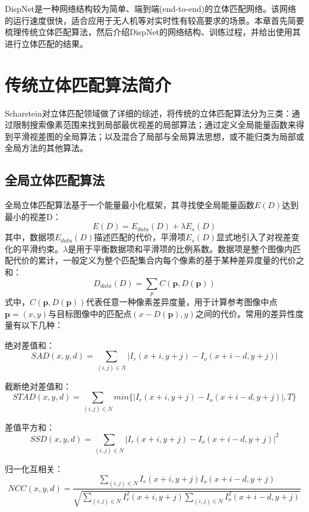 DispNet\cite{mayer2016large}是一种网络结构较为简单、端到端(end-to-end)的立体匹配网络。该网络的运行速度很快，适合应用于无人机等对实时性有较高要求的场景。本章首先简要梳理传统立体匹配算法，然后介绍DispNet的网络结构、训练过程，并给出使用其进行立体匹配的结果。


\section{传统立体匹配算法简介}
Scharstein\cite{Scharstein2002}对立体匹配领域做了详细的综述，将传统的立体匹配算法分为三类：通过限制搜索像素范围来找到局部最优视差的局部算法；通过定义全局能量函数来得到平滑视差图的全局算法；以及混合了局部与全局算法思想，或不能归类为局部或全局方法的其他算法。

\subsection{全局立体匹配算法}
全局立体匹配算法基于一个能量最小化框架，其寻找使全局能量函数$E(D)$达到最小的视差D：
%
\begin{equation}\label{eq:4_0_energy_function}
E(D) = E_{data}(D) + \lambda E_s(D)
\end{equation}
其中，数据项$E_{data}(D)$描述匹配的代价，平滑项$E_s(D)$显式地引入了对视差变化的平滑约束。$\lambda$是用于平衡数据项和平滑项的比例系数。数据项是整个图像内匹配代价的累计，一般定义为整个匹配集合内每个像素的基于某种差异度量的代价之和：
%
\begin{equation}\label{eq:4_0_energy_function_data_term}
D_{data}(D) = \sum_{p} C(\mathbf{p}, D(\mathbf{p}))
\end{equation}
式中，$C(\mathbf{p}, D(\mathbf{p}))$代表任意一种像素差异度量，用于计算参考图像中点$\mathbf{p} = (x,y)$与目标图像中的匹配点$(x-D(\mathbf{p}),y)$之间的代价。常用的差异性度量有以下几种：

绝对差值和：
\[ SAD(x,y,d) = \sum_{(i,j) \in N} |I_r(x+i, y+j) - I_o(x+i-d, y+j)|  \]

截断绝对差值和：
\[ STAD(x,y,d) = \sum_{(i,j) \in N} min \{ |I_r(x+i, y+j) - I_o(x+i-d, y+j)|  , T \} \]

差值平方和：
\[ SSD(x,y,d) = \sum_{(i,j) \in N} |I_r(x+i, y+j) - I_o(x+i-d, y+j)|^2  \]

归一化互相关：
\[ NCC(x,y,d) = \frac{\sum_{(i,j)\in N} I_r(x+i, y+j)  I_o(x+i-d, y+j) }
{\sqrt   {\sum_{(i,j) \in N} I_r^2(x+i,y+j)  \sum_ {(i,j) \in N} I_o^2(x+i-d, y+j) } }  \]

